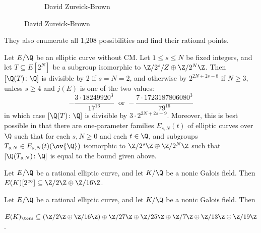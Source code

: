 \begin{frame}[plain]
\begin{figure}[h]
\begin{subfigure}{0.3\textwidth}
	\caption{David Zureick-Brown}
	\end{subfigure}
	\end{figure}
\begin{rem}
They also enumerate all 1,208 possibilities and find their rational points. 
\end{rem}
\end{frame}



\begin{frame}[plain]
\begin{thm}
Let $E/\Q$ be an elliptic curve without CM. Let $1 \leq s \leq N$ be fixed integers, and let $T \subseteq E[2^N]$ be a subgroup isomorphic to $\Z/2^s/Z \oplus \Z/2^N \Z$. Then $[\Q(T) \colon \Q]$ is divisible by 2 if $s=N=2$, and otherwise by $2^{2N+2s-8}$ if $N \geq 3$, unless $s \geq 4$ and $j(E)$ is one of the two values:
	\[
	- \dfrac{3 \cdot 18249920^3}{17^{16}}\; \text{ or } - \dfrac{7 \cdot 1723187806080^3}{79^{16}}
	\]
in which case $[\Q(T) \colon \Q]$ is divisible by $3 \cdot 2^{2N+2s-9}$. Moreover, this is best possible in that there are one-parameter families $E_{s,N}(t)$ of elliptic curves over $\Q$ such that for each $s, N \geq 0$ and each $t \in \Q$, and subgroups $T_{s,N} \in E_{s,N}(t)(\ov{\Q})$ isomorphic to $\Z/2^s\Z \oplus \Z/2^N\Z$ such that $[\Q(T_{s,N}) \colon \Q]$ is equal to the bound given above. 
\end{thm}
\end{frame}



\begin{frame}[plain]
\begin{lem}
Let $E/\Q$ be a rational elliptic curve, and let $K/\Q$ be a nonic Galois field. Then $E(K)[2^\infty] \subseteq \Z/2\Z \oplus \Z/16\Z$.
\end{lem}
\end{frame}



\begin{frame}[plain]
\begin{prop}
Let $E/\Q$ be a rational elliptic curve, and let $K/\Q$ be a nonic Galois field. Then \par\vspace{\baselineskip}

\small{$E(K)_\tors \subseteq (\Z/2\Z \oplus \Z/16\Z) \oplus \Z/27\Z \oplus \Z/25\Z \oplus \Z/7\Z \oplus \Z/13\Z \oplus \Z/19\Z$}. \par\vspace{\baselineskip}
\end{prop}
\end{frame}




